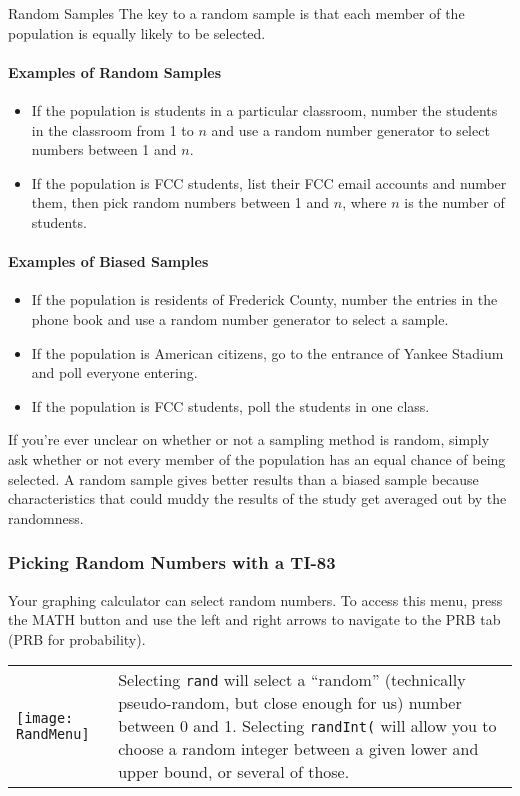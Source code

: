 \begin{proc}{Random Samples}
The key to a random sample is that each member of the population is equally likely to be selected.

\paragraph{Examples of Random Samples}
\begin{itemize}
\item If the population is students in a particular classroom, number the students in the classroom from 1 to $n$ and use a random number generator to select numbers between 1 and $n$.
\item If the population is FCC students, list their FCC email accounts and number them, then pick random numbers between 1 and $n$, where $n$ is the number of students.
\end{itemize}

\paragraph{Examples of Biased Samples}
\begin{itemize}
\item {}If the population is residents of Frederick County, number the entries in the phone book and use a random number generator to select a sample.
\item If the population is American citizens, go to the entrance of Yankee Stadium and poll everyone entering.
\item If the population is FCC students, poll the students in one class.
\end{itemize}

If you're ever unclear on whether or not a sampling method is random, simply ask whether or not every member of the population has an equal chance of being selected.  A random sample gives better results than a biased sample because characteristics that could muddy the results of the study get averaged out by the randomness.
\end{proc}
\vspace{0.5in}

\subsubsection*{Picking Random Numbers with a TI-83}
Your graphing calculator can select random numbers.  To access this menu, press the MATH button and use the left and right arrows to navigate to the PRB tab (PRB for probability).
\begin{center}
\begin{tabular}{l b{}}
\texttt{[image: RandMenu]} & Selecting \texttt{rand} will select a ``random'' (technically pseudo-random, but close enough for us) number between 0 and 1.  Selecting \texttt{randInt(} will allow you to choose a random integer between a given lower and upper bound, or several of those.
\end{tabular}
\end{center}

